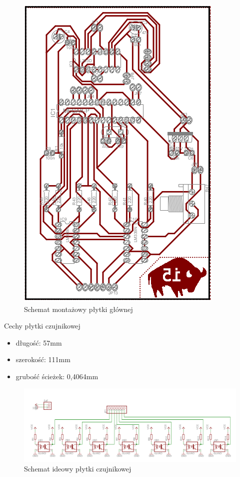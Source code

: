 \documentclass[11pt,a4paper]{article}
\begin{document}
\begin{center}
    \begin{figure}[H]
    \includegraphics[scale=0.8]{schemat_glowna_m}
    \caption{Schemat montażowy płytki głównej}
    \end{figure}
  \end{center}
  
  Cechy płytki czujnikowej
  \begin{itemize}
    \item długość: 57mm
    \item szerokość: 111mm
    \item grubość ścieżek: 0,4064mm
  \end{itemize}

    \begin{figure}[H]
    \includegraphics[scale=0.38, angle=180]{schemat_czujniki}
    \caption{Schemat ideowy płytki czujnikowej}
    \end{figure}
\end{document}
